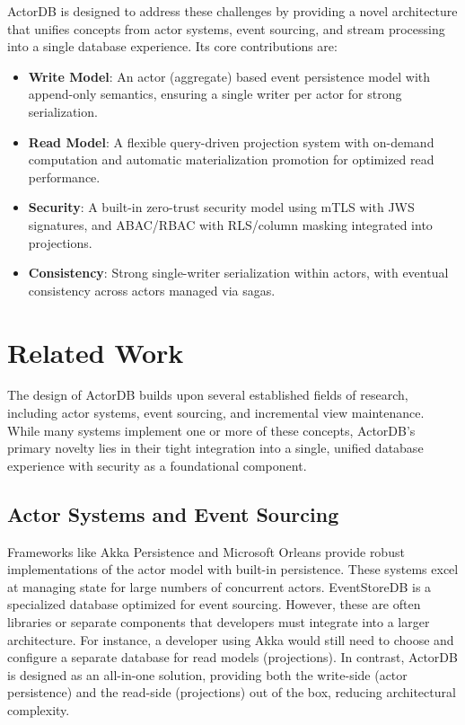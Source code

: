 \documentclass{article}
\begin{document}
ActorDB is designed to address these challenges by providing a novel architecture that unifies concepts from actor systems, event sourcing, and stream processing into a single database experience. Its core contributions are:
\begin{itemize}
    \item \textbf{Write Model}: An actor (aggregate) based event persistence model with append-only semantics, ensuring a single writer per actor for strong serialization.
    \item \textbf{Read Model}: A flexible query-driven projection system with on-demand computation and automatic materialization promotion for optimized read performance.
    \item \textbf{Security}: A built-in zero-trust security model using mTLS with JWS signatures, and ABAC/RBAC with RLS/column masking integrated into projections.
    \item \textbf{Consistency}: Strong single-writer serialization within actors, with eventual consistency across actors managed via sagas.
\end{itemize}

\section{Related Work}
The design of ActorDB builds upon several established fields of research, including actor systems, event sourcing, and incremental view maintenance. While many systems implement one or more of these concepts, ActorDB's primary novelty lies in their tight integration into a single, unified database experience with security as a foundational component.

\subsection{Actor Systems and Event Sourcing}
Frameworks like Akka Persistence and Microsoft Orleans provide robust implementations of the actor model with built-in persistence. These systems excel at managing state for large numbers of concurrent actors. EventStoreDB is a specialized database optimized for event sourcing. However, these are often libraries or separate components that developers must integrate into a larger architecture. For instance, a developer using Akka would still need to choose and configure a separate database for read models (projections). In contrast, ActorDB is designed as an all-in-one solution, providing both the write-side (actor persistence) and the read-side (projections) out of the box, reducing architectural complexity.
\end{document}
